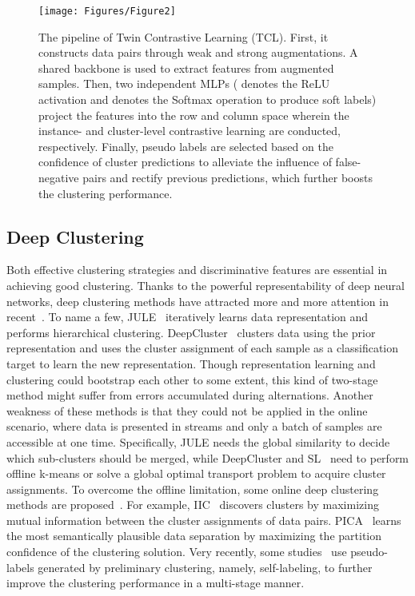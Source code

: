 \begin{figure*}[t]\centering
    \texttt{[image: Figures/Figure2]}
    \caption{The pipeline of Twin Contrastive Learning (TCL). First, it constructs data pairs through weak and strong augmentations. A shared backbone is used to extract features from augmented samples. Then, two independent MLPs ( denotes the ReLU activation and  denotes the Softmax operation to produce soft labels) project the features into the row and column space wherein the instance- and cluster-level contrastive learning are conducted, respectively. Finally, pseudo labels are selected based on the confidence of cluster predictions to alleviate the influence of false-negative pairs and rectify previous predictions, which further boosts the clustering performance.}
    \label{fig:framework}
\end{figure*}

\subsection{Deep Clustering}
Both effective clustering strategies and discriminative features are essential in achieving good clustering. Thanks to the powerful representability of deep neural networks, deep clustering methods have attracted more and more attention in recent~\citep{peng2016deep, DEC, guo2017improved, deepclustering_wangqi, peng2018structured, peng2022xai, JULE, DeepClustering, SelfLabling, li2020prototypical}. To name a few, JULE~\citep{JULE} iteratively learns data representation and performs hierarchical clustering. DeepCluster~\citep{DeepClustering} clusters data using the prior representation and uses the cluster assignment of each sample as a classification target to learn the new representation. Though representation learning and clustering could bootstrap each other to some extent, this kind of two-stage method might suffer from errors accumulated during alternations. Another weakness of these methods is that they could not be applied in the online scenario, where data is presented in streams and only a batch of samples are accessible at one time. Specifically, JULE needs the global similarity to decide which sub-clusters should be merged, while DeepCluster and SL~\citep{SelfLabling} need to perform offline k-means or solve a global optimal transport problem to acquire cluster assignments. To overcome the offline limitation, some online deep clustering methods are proposed~\citep{CC, zhong2020deep, dang2021doubly, IIC, PICA}. For example, IIC~\citep{IIC} discovers clusters by maximizing mutual information between the cluster assignments of data pairs. PICA~\citep{PICA} learns the most semantically plausible data separation by maximizing the partition confidence of the clustering solution. Very recently, some studies~\citep{SCAN, RUC, SPICE} use pseudo-labels generated by preliminary clustering, namely, self-labeling, to further improve the clustering performance in a multi-stage manner.

